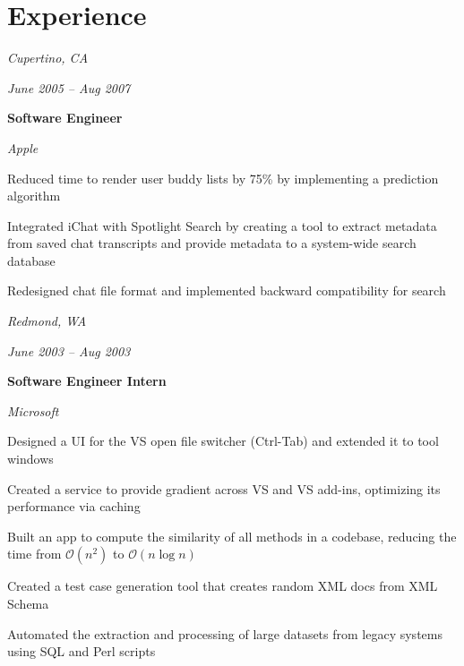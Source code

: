 \documentclass[10pt, letterpaper]{article}
\begin{document}
    
    \section{Experience}



        
        \begin{twocolentry}{
        \textit{Cupertino, CA}    
            
        \textit{June 2005 – Aug 2007}}
            \textbf{Software Engineer}
            
            \textit{Apple}
        \end{twocolentry}

        \vspace{0.10 cm}
        \begin{onecolentry}
            \begin{highlights}
                \item Reduced time to render user buddy lists by 75\% by implementing a prediction algorithm
                \item Integrated iChat with Spotlight Search by creating a tool to extract metadata from saved chat transcripts and provide metadata to a system-wide search database
                \item Redesigned chat file format and implemented backward compatibility for search
            \end{highlights}
        \end{onecolentry}


        \vspace{0.2 cm}

        \begin{twocolentry}{
        \textit{Redmond, WA}    
            
        \textit{June 2003 – Aug 2003}}
            \textbf{Software Engineer Intern}
            
            \textit{Microsoft}
        \end{twocolentry}

        \vspace{0.10 cm}
        \begin{onecolentry}
            \begin{highlights}
                \item Designed a UI for the VS open file switcher (Ctrl-Tab) and extended it to tool windows
                \item Created a service to provide gradient across VS and VS add-ins, optimizing its performance via caching
                \item Built an app to compute the similarity of all methods in a codebase, reducing the time from $\mathcal{O}(n^2)$ to $\mathcal{O}(n \log n)$
                \item Created a test case generation tool that creates random XML docs from XML Schema
                \item Automated the extraction and processing of large datasets from legacy systems using SQL and Perl scripts
            \end{highlights}
        \end{onecolentry}
\end{document}
